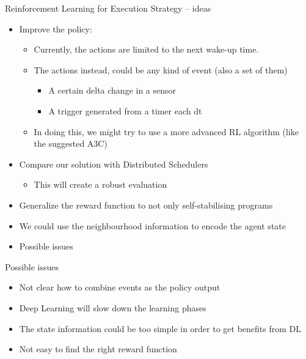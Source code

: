 \documentclass[presentation, 9pt]{beamer}\mode<presentation>{\usetheme{AMSBolognaFC}}
\begin{document}
\begin{frame}{Reinforcement Learning for Execution Strategy -- ideas}
\begin{itemize}
		\item Improve the policy:
		\begin{itemize}
			\item Currently, the actions are limited to the next wake-up time.
			\item The actions instead, could be any kind of event (also a set of them)
			\begin{itemize}
				\item A certain delta change in a sensor
				\item A trigger generated from a timer each dt 
			\end{itemize}
			\item In doing this, we might try to use a more advanced RL algorithm (like the suggested A3C)
		\end{itemize}
		\item Compare our solution with Distributed Schedulers
		\begin{itemize}
			\item This will create a robust evaluation
		\end{itemize}
		\item Generalize the reward function to not only self-stabilising programs
		\item We could use the neighbourhood information to encode the agent state
		\item Possible issues
		
\end{itemize}
\begin{block}{Possible issues}
\begin{itemize}
	\item Not clear how to combine events as the policy output
	\item Deep Learning will slow down the learning phases
	\item The state information could be too simple in order to get benefits from DL
	\item Not easy to find the right reward function 
\end{itemize}
\end{block}
\end{frame}
\end{document}
